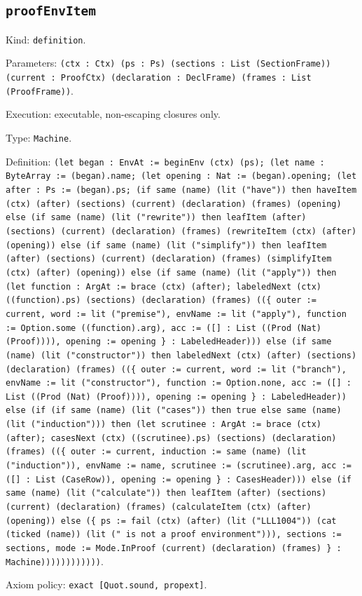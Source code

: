 \documentclass[11pt]{article}
\begin{document}
\subsection*{\texttt{proofEnvItem}}
\noindent Kind: \texttt{definition}.\par
\noindent Parameters: \texttt{(ctx : Ctx) (ps : Ps) (sections : List (SectionFrame)) (current : ProofCtx) (declaration : DeclFrame) (frames : List (ProofFrame))}.\par
\noindent Execution: executable, non-escaping closures only.\par
\noindent Type: \texttt{Machine}.\par
\noindent Definition: \texttt{(let began : EnvAt := beginEnv (ctx) (ps); (let name : ByteArray := (began).name; (let opening : Nat := (began).opening; (let after : Ps := (began).ps; (if same (name) (lit ("have")) then haveItem (ctx) (after) (sections) (current) (declaration) (frames) (opening) else (if same (name) (lit ("rewrite")) then leafItem (after) (sections) (current) (declaration) (frames) (rewriteItem (ctx) (after) (opening)) else (if same (name) (lit ("simplify")) then leafItem (after) (sections) (current) (declaration) (frames) (simplifyItem (ctx) (after) (opening)) else (if same (name) (lit ("apply")) then (let function : ArgAt := brace (ctx) (after); labeledNext (ctx) ((function).ps) (sections) (declaration) (frames) ((\{ outer := current, word := lit ("premise"), envName := lit ("apply"), function := Option.some ((function).arg), acc := ([] : List ((Prod (Nat) (Proof)))), opening := opening \} : LabeledHeader))) else (if same (name) (lit ("constructor")) then labeledNext (ctx) (after) (sections) (declaration) (frames) ((\{ outer := current, word := lit ("branch"), envName := lit ("constructor"), function := Option.none, acc := ([] : List ((Prod (Nat) (Proof)))), opening := opening \} : LabeledHeader)) else (if (if same (name) (lit ("cases")) then true else same (name) (lit ("induction"))) then (let scrutinee : ArgAt := brace (ctx) (after); casesNext (ctx) ((scrutinee).ps) (sections) (declaration) (frames) ((\{ outer := current, induction := same (name) (lit ("induction")), envName := name, scrutinee := (scrutinee).arg, acc := ([] : List (CaseRow)), opening := opening \} : CasesHeader))) else (if same (name) (lit ("calculate")) then leafItem (after) (sections) (current) (declaration) (frames) (calculateItem (ctx) (after) (opening)) else (\{ ps := fail (ctx) (after) (lit ("LLL1004")) (cat (ticked (name)) (lit (" is not a proof environment"))), sections := sections, mode := Mode.InProof (current) (declaration) (frames) \} : Machine))))))))))))}.\par
\noindent Axiom policy: \texttt{exact [Quot.sound, propext]}.\par
\end{document}
